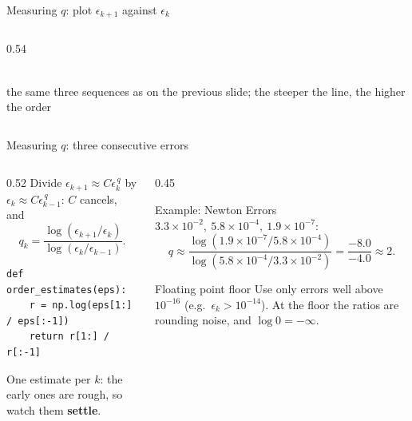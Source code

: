 \documentclass[aspectratio=169]{beamer}
\begin{document}
\begin{frame}{Measuring $q$: plot $\epsilon_{k+1}$ against $\epsilon_k$}
\begin{columns}[c]
\begin{column}{0.54\textwidth}
\\
\scriptsize the same three sequences as on the previous slide; the steeper the line, the higher the order
\end{column}
\end{columns}
\end{frame}

\begin{frame}[fragile]{Measuring $q$: three consecutive errors}
\begin{columns}[T]
\begin{column}{0.52\textwidth}
\small
Divide $\epsilon_{k+1} \approx C\epsilon_k^{\,q}$ by $\epsilon_k \approx C\epsilon_{k-1}^{\,q}$: $C$ cancels, and
\[
q_k = \frac{\log(\epsilon_{k+1}/\epsilon_k)}{\log(\epsilon_k/\epsilon_{k-1})}.
\]
\begin{lstlisting}[basicstyle=\ttfamily\scriptsize]
def order_estimates(eps):
    r = np.log(eps[1:] / eps[:-1])
    return r[1:] / r[:-1]
\end{lstlisting}
\footnotesize One estimate per $k$: the early ones are rough, so watch them \textbf{settle}.
\end{column}
\begin{column}{0.45\textwidth}
\begin{exampleblock}{Example: Newton}
\footnotesize Errors $3.3\times10^{-2},\ 5.8\times10^{-4},\ 1.9\times10^{-7}$:
\[
q \approx \frac{\log(1.9\times10^{-7} / 5.8\times10^{-4})}{\log(5.8\times10^{-4} / 3.3\times10^{-2})} = \frac{-8.0}{-4.0} \approx 2 .
\]
\end{exampleblock}
\begin{alertblock}{Floating point floor}
\scriptsize Use only errors well above $10^{-16}$ (e.g.\ $\epsilon_k > 10^{-14}$). At the floor the ratios are rounding noise, and $\log 0 = -\infty$.
\end{alertblock}
\end{column}
\end{columns}
\end{frame}
\end{document}
